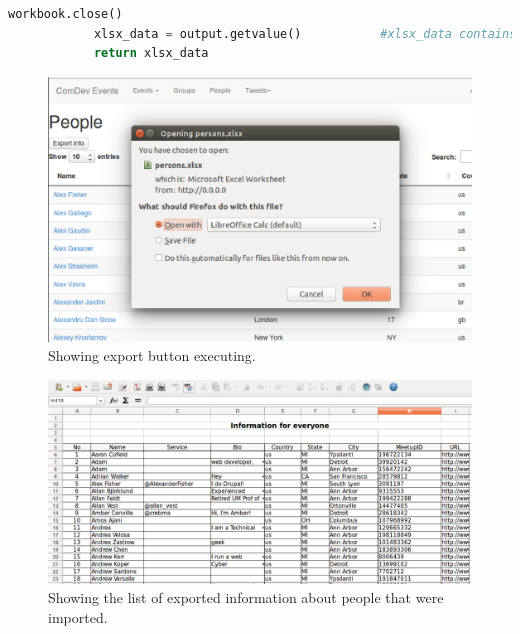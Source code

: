 \documentclass[draftclsnofoot,10pt,onecolumn]{IEEEtran} %
\begin{document}
\begin{enumerate}
\begin{center}
\begin{lstlisting}[caption=excelutils.py file where the worksheet is generated and exported as an xlsx file, language=Python]
            workbook.close()
            xlsx_data = output.getvalue()           #xlsx_data contains the Excel file
            return xlsx_data
      \end{lstlisting}
    \end{center}
\end{enumerate}


\begin{figure}[H]
  \begin{center}
  \includegraphics[width=5in, frame]{exporting1}
  \captionsetup{width=.4\linewidth}
  \centering
  \caption{Showing export button executing. }

  \end{center}
\end{figure}

\begin{figure}[H]
  \begin{center}
  
  \includegraphics[width=6in, frame]{exporting2}
  \captionsetup{width=.4\linewidth}
  \centering
  \caption{Showing the list of exported information about people that were imported. }

  \end{center}
\end{figure}
\end{document}
